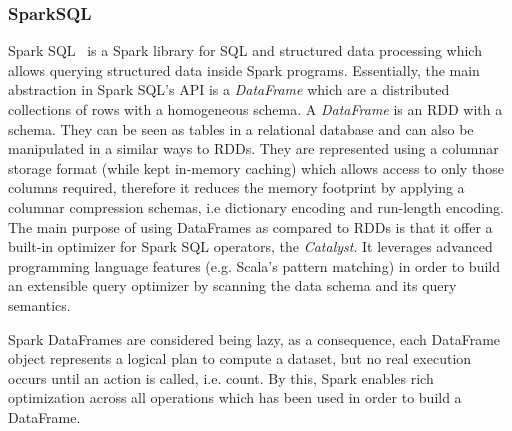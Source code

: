 \subsubsection{SparkSQL}
Spark SQL~\cite{Armbrust2015SSR} is a Spark library for SQL and structured data processing which allows querying structured data inside Spark programs.
Essentially, the main abstraction in Spark SQL’s API is a \textit{DataFrame} which are a distributed collections of rows with a homogeneous schema.
A \textit{DataFrame} is an \gls{RDD} with a schema.
They can be seen as tables in a relational database and can also be manipulated in a similar ways to \gls{RDD}s.
They are represented using a columnar storage format (while kept in-memory caching) which allows access to only those columns required, therefore it reduces the memory footprint by applying a columnar compression schemas, i.e dictionary encoding and run-length encoding.
The main purpose of using DataFrames as compared to RDDs is that it offer a built-in optimizer for Spark SQL operators, the \textit{Catalyst}.
It leverages advanced programming language features (e.g. Scala’s pattern matching) in order to build an extensible query optimizer by scanning the data schema and its query semantics.

Spark DataFrames are considered being lazy, as a consequence, each DataFrame object represents a logical plan to compute a dataset, but no real execution occurs until an action is called, i.e. count.
By this, Spark enables rich optimization across all operations which has been used in order to build a DataFrame.



